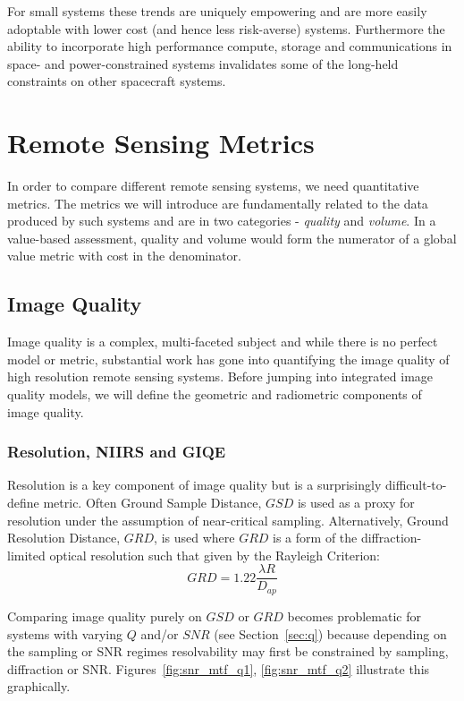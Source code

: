 \documentclass[10pt,journal]{IEEEtran}  %
\begin{document}
For small systems these trends are uniquely empowering and are more easily adoptable with lower cost (and hence less risk-averse) systems.  Furthermore the ability to incorporate high performance compute, storage and communications in space- and power-constrained systems invalidates some of the long-held constraints on other spacecraft systems.

\section{Remote Sensing Metrics}
\label{sec:Metrics}
In order to compare different remote sensing systems, we need quantitative metrics.  The metrics we will introduce are fundamentally related to the data produced by such systems and are in two categories - \emph{quality} and \emph{volume}.  In a value-based assessment, quality and volume would form the numerator of a global value metric with cost in the denominator.

\subsection{Image Quality}
\label{sec:iq}

Image quality is a complex, multi-faceted subject and while there is no perfect model or metric, substantial work has gone into quantifying the image quality of high resolution remote sensing systems.  Before jumping into integrated image quality models, we will define the geometric and radiometric components of image quality.

\subsubsection{Resolution, NIIRS and GIQE}
Resolution is a key component of image quality but is a surprisingly difficult-to-define metric.  Often Ground Sample Distance, $GSD$ is used as a proxy for resolution under the assumption of near-critical sampling.
Alternatively, Ground Resolution Distance, $GRD$, is used where $GRD$ is a form of the diffraction-limited optical resolution such that given by the Rayleigh Criterion:
\begin{equation}
    GRD = 1.22 \frac{\lambda R}{D_{ap}}
\end{equation}

Comparing image quality purely on $GSD$ or $GRD$ becomes problematic for systems with varying $Q$ and/or $SNR$ (see Section~\ref{sec:q}) because depending on the sampling or SNR regimes resolvability may first be constrained by sampling, diffraction or SNR.  Figures~\ref{fig:snr_mtf_q1}, \ref{fig:snr_mtf_q2} illustrate this graphically.
\end{document}
